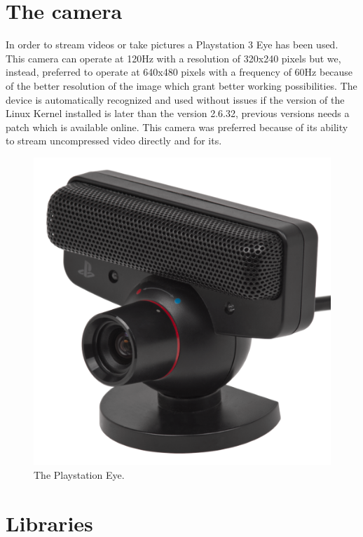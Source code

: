 \section{The camera}
In order to stream videos or take pictures a Playstation 3 Eye has been used.
This camera can operate at 120Hz with a resolution of 320x240 pixels but we, instead, preferred to operate at 640x480 pixels with a frequency of 60Hz because of the better resolution of the image which grant better working possibilities. The device is automatically recognized and used without issues if the version of the Linux Kernel installed is later than the version 2.6.32, previous versions needs a patch which is available online.
This camera was preferred because of its ability to stream uncompressed video directly \cite{pseyecompr} and for its.


\begin{figure}[hbt]
    \centering
    \includegraphics{img/pseye.png}
    \caption{The Playstation Eye.}
\end{figure}
 
\newpage
\section{Libraries}

